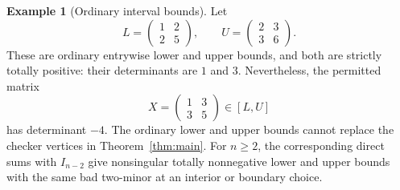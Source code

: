 \documentclass[11pt]{article}
\theoremstyle{definition}
\newtheorem{example}[theorem]{Example}
\theoremstyle{remark}
\numberwithin{equation}{section}
\begin{document}
\begin{example}[Ordinary interval bounds]\label{ex:ordinary}
Let
\[
 L=\begin{pmatrix}1&2\\2&5\end{pmatrix},\qquad
 U=\begin{pmatrix}2&3\\3&6\end{pmatrix}.
\]
These are ordinary entrywise lower and upper bounds, and both
are strictly totally positive: their determinants are $1$ and $3$.
Nevertheless, the permitted matrix
\[
 X=\begin{pmatrix}1&3\\3&5\end{pmatrix}\in[L,U]
\]
has determinant $-4$. The ordinary lower and upper bounds
cannot replace the checker vertices in Theorem~\ref{thm:main}.
For $n\geq2$, the corresponding direct sums with $I_{n-2}$
give nonsingular totally nonnegative lower and upper bounds
with the same bad two-minor at an interior or boundary choice.
\end{example}
\end{document}
